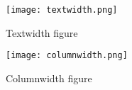 \documentclass[letterpaper, 10pt]{article}
\begin{document}
\begin{figure}[hp]
\centering
\texttt{[image: textwidth.png]}
\caption{Textwidth figure}
\end{figure}

\begin{figure}[hp]
\centering
\texttt{[image: columnwidth.png]}
\caption{Columnwidth figure}
\end{figure}
\end{document}
